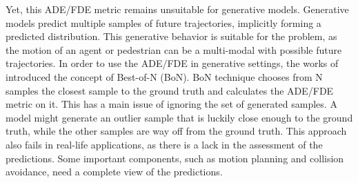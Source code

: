 \documentclass[runningheads]{llncs}
\begin{document}
Yet, this ADE/FDE metric remains unsuitable for generative models. Generative models predict multiple samples of future trajectories, implicitly forming a predicted distribution. This generative behavior is suitable for the problem, as the motion of an agent or pedestrian can be a multi-modal with possible future trajectories. In order to use the ADE/FDE in generative settings, the works of~\cite{alahi2016social,gupta2018social} introduced the concept of Best-of-N (BoN). BoN technique chooses from N samples the closest sample to the ground truth and calculates the ADE/FDE metric on it. This has a main issue of ignoring the set of generated samples. A model might generate an outlier sample that is luckily close enough to the ground truth, while the other samples are way off from the ground truth. This approach also fails in real-life applications, as there is a lack in the assessment of the predictions. Some important components, such as motion planning and collision avoidance, need a complete view of the predictions.
\end{document}
